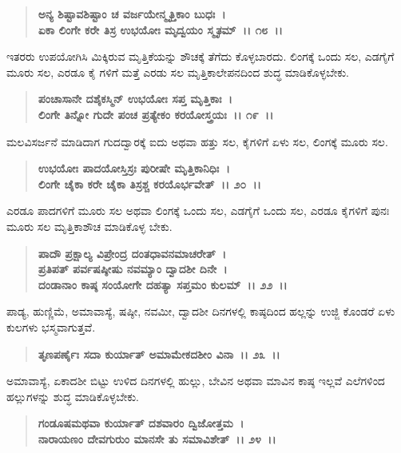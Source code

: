 \begin{verse}
\textbf{ಅನ್ಯ ಶಿಷ್ಟಾವಶಿಷ್ಟಾಂ ಚ ವರ್ಜಯೇನ್ಮೃತ್ತಿಕಾಂ ಬುಧಃ~।}\\\textbf{ಏಕಾ ಲಿಂಗೇ ಕರೇ ತಿಸ್ರ ಉಭಯೋಃ ಮೃದ್ವಯಂ ಸ್ಮೃತಮ್~।। ೧೮~।।}
\end{verse}

ಇತರರು ಉಪಯೋಗಿಸಿ ಮಿಕ್ಕಿರುವ ಮೃತ್ತಿಕೆಯನ್ನು ಶೌಚಕ್ಕೆ ತೆಗೆದು ಕೊಳ್ಳಬಾರದು. ಲಿಂಗಕ್ಕೆ ಒಂದು ಸಲ, ಎಡಗೈಗೆ ಮೂರು ಸಲ, ಎರಡೂ ಕೈ ಗಳಿಗೆ ಮತ್ತೆ ಎರಡು ಸಲ ಮೃತ್ತಿಕಾ\-ಲೇಪನದಿಂದ ಶುದ್ಧ ಮಾಡಿಕೊಳ್ಳಬೇಕು.

\begin{verse}
\textbf{ಪಂಚಾಸಾನೇ ದಶೈಕಸ್ಮಿನ್ ಉಭಯೋಃ ಸಪ್ತ ಮೃತ್ತಿಕಾಃ~।}\\\textbf{ಲಿಂಗೇ ತಿನ್ನೋ ಗುದೇ ಪಂಚ ಪ್ರತ್ಯೇಕಂ ಕರಯೋಸ್ತ್ರಯಃ~।। ೧೯~।।}
\end{verse}

ಮಲವಿಸರ್ಜನೆ ಮಾಡಿದಾಗ ಗುದದ್ವಾರಕ್ಕೆ ಐದು ಅಥವಾ ಹತ್ತು ಸಲ, ಕೈಗಳಿಗೆ ಏಳು ಸಲ, ಲಿಂಗಕ್ಕೆ ಮೂರು ಸಲ.

\begin{verse}
\textbf{ಉಭಯೋಃ ಪಾದಯೋಸ್ತಿಸ್ರಃ ಪುರೀಷೇ ಮೃತ್ತಿಕಾನಿಧಿಃ~।}\\\textbf{ಲಿಂಗೇ ಚೈಕಾ ಕರೇ ಚೈಕಾ ತಿಸ್ರಶ್ಚ ಕರಯೊರ್ಭವೇತ್~।। ೨೦~।।}
\end{verse}

ಎರಡೂ ಪಾದಗಳಿಗೆ ಮೂರು ಸಲ ಅಥವಾ ಲಿಂಗಕ್ಕೆ ಒಂದು ಸಲ, ಎಡಗೈಗೆ ಒಂದು ಸಲ, ಎರಡೂ ಕೈಗಳಿಗೆ ಪುನಃ ಮೂರು ಸಲ ಮೃತ್ತಿಕಾಶೌಚ ಮಾಡಿಕೊಳ್ಳ ಬೇಕು.

\begin{verse}
\textbf{ಪಾದೌ ಪ್ರಕ್ಷಾಲ್ಯ ವಿಪ್ರೇಂದ್ರ ದಂತಧಾವನಮಾಚರೇತ್~।}\\\textbf{ಪ್ರತಿಪತ್ ಪರ್ವಷಷ್ಠೀಷು ನವಮ್ಯಾಂ ದ್ವಾದಶೀ ದಿನೇ~।}\\\textbf{ದಂಡಾನಾಂ ಕಾಷ್ಠ ಸಂಯೋಗೇ ದಹತ್ಯಾ ಸಪ್ತಮಂ ಕುಲಮ್~।। ೨೨~।।}
\end{verse}

ಪಾಡ್ಯ, ಹುಣ್ಣಿಮೆ, ಅಮಾವಾಸ್ಯೆ, ಷಷ್ಠೀ, ನವಮೀ, ದ್ವಾದಶೀ ದಿನಗಳಲ್ಲಿ ಕಾಷ್ಠದಿಂದ ಹಲ್ಲನ್ನು ಉಜ್ಜಿ ಕೊಂಡರೆ ಏಳು ಕುಲಗಳು ಭಸ್ಮವಾಗುತ್ತವೆ.

\begin{verse}
\textbf{ತೃಣಪರ್ಣೈಃ ಸದಾ ಕುರ್ಯಾತ್ ಅಮಾಮೇಕದಶೀಂ ವಿನಾ~।। ೨೩~।।}
\end{verse}

ಅಮಾವಾಸ್ಯೆ, ಏಕಾದಶೀ ಬಿಟ್ಟು ಉಳಿದ ದಿನಗಳಲ್ಲಿ ಹುಲ್ಲು, ಬೇವಿನ ಅಥವಾ ಮಾವಿನ ಕಾಷ್ಠ ಇಲ್ಲವೆ ಎಲೆಗಳಿಂದ ಹಲ್ಲುಗಳನ್ನು ಶುದ್ಧ ಮಾಡಿಕೊಳ್ಳಬೇಕು.

\begin{verse}
\textbf{ಗಂಡೂಷಮಥವಾ ಕುರ್ಯಾತ್ ದಶವಾರಂ ದ್ವಿಜೋತ್ತಮ~।}\\\textbf{ನಾರಾಯಣಂ ದೇವಗುರುಂ ಮಾನಸೇ ತು ಸಮಾವಿಶೇತ್~।। ೨೪~।।}
\end{verse}

